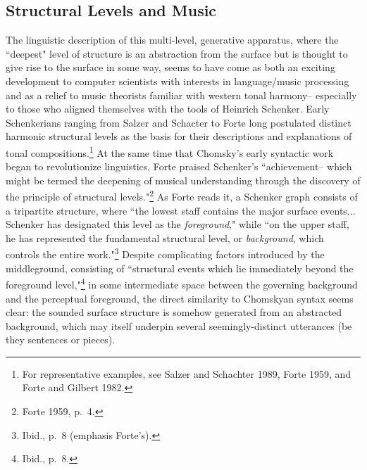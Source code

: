 \subsection{Structural Levels and Music}
The linguistic description of this multi-level, generative apparatus, where the ``deepest" level of structure is an abstraction from the surface but is thought to give rise to the surface in some way, seems to have come as both an exciting development to computer scientists with interests in language/music processing and as a relief to music theorists familiar with western tonal harmony-- especially to those who aligned themselves with the tools of Heinrich Schenker.  Early Schenkerians ranging from Salzer and Schacter to Forte long postulated distinct harmonic structural levels as the basis for their descriptions and explanations of tonal compositions.\footnote{For representative examples, see Salzer and Schachter 1989, Forte 1959, and Forte and Gilbert 1982.}   At the same time that Chomsky's early syntactic work began to revolutionize linguistics, Forte praised Schenker's ``achievement-- which might be termed the deepening of musical understanding through the discovery of the principle of structural levels."\footnote{Forte 1959, p.\ 4.}  As Forte reads it, a Schenker graph consists of a tripartite structure, where ``the lowest staff contains the major surface events... Schenker has designated this level as the \emph{foreground}," while ``on the upper staff, he has represented the fundamental structural level, or \emph{background}, which controls the entire work."\footnote{Ibid., p.\ 8 (emphasis Forte's).}  Despite complicating factors introduced by the middleground, consisting of ``structural events which lie immediately beyond the foreground level,"\footnote{Ibid., p.\ 8.} in some intermediate space between the governing background and the perceptual foreground, the direct similarity to Chomskyan syntax seems clear: the sounded surface structure is somehow generated from an abstracted background, which may itself underpin several seemingly-distinct utterances (be they sentences or pieces).

